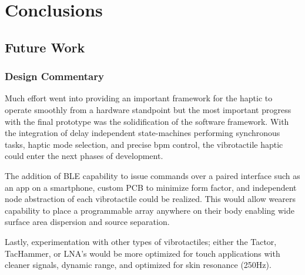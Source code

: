 
\chapter{Conclusions} \label{chapConclusions}

\section{Future Work}
\subsection{Design Commentary}
Much effort went into providing an important framework for the haptic to operate smoothly from a hardware standpoint but the most important progress with the final prototype was the solidification of the software framework. With the integration of delay independent state-machines performing synchronous tasks, haptic mode selection, and precise bpm control, the vibrotactile haptic could enter the next phases of development. 

The addition of BLE capability to issue commands over a paired interface such as an app on a smartphone, custom PCB to minimize form factor, and independent node abstraction of each vibrotactile could be realized. This would allow wearers capability to place a programmable array anywhere on their body enabling wide surface area dispersion and source separation. 

Lastly, experimentation with other types of vibrotactiles; either the Tactor, TacHammer, or LNA's would be more optimized for touch applications with cleaner signals, dynamic range, and optimized for skin resonance (250Hz).

